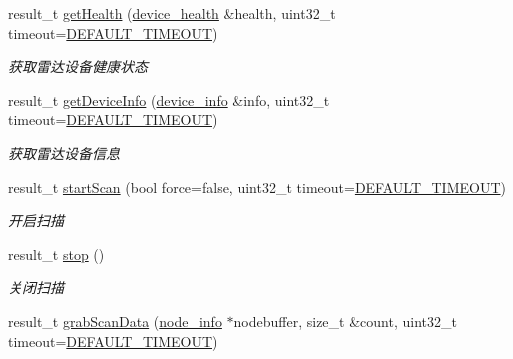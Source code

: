 \begin{DoxyCompactItemize}
\begin{DoxyCompactList}
\end{DoxyCompactList}\item 
result\+\_\+t \hyperlink{classydlidar_1_1_y_dlidar_driver_a9fe6f8b842a2aff2c3ae13f8423b03f4}{get\+Health} (\hyperlink{structdevice__health}{device\+\_\+health} \&health, uint32\+\_\+t timeout=\hyperlink{classydlidar_1_1_y_dlidar_driver_a13a4f2dc4067b43794b2c47c06d5d27aa07c79ce96f468ff4b40495ef84584442}{D\+E\+F\+A\+U\+L\+T\+\_\+\+T\+I\+M\+E\+O\+UT})
\begin{DoxyCompactList}\small\item\em 获取雷达设备健康状态 ~\newline
\end{DoxyCompactList}\item 
result\+\_\+t \hyperlink{classydlidar_1_1_y_dlidar_driver_ab75303116c4ccb144ecc215e94114e1a}{get\+Device\+Info} (\hyperlink{structdevice__info}{device\+\_\+info} \&info, uint32\+\_\+t timeout=\hyperlink{classydlidar_1_1_y_dlidar_driver_a13a4f2dc4067b43794b2c47c06d5d27aa07c79ce96f468ff4b40495ef84584442}{D\+E\+F\+A\+U\+L\+T\+\_\+\+T\+I\+M\+E\+O\+UT})
\begin{DoxyCompactList}\small\item\em 获取雷达设备信息 ~\newline
\end{DoxyCompactList}\item 
result\+\_\+t \hyperlink{classydlidar_1_1_y_dlidar_driver_a62888da8520422b7daaae89c2935460b}{start\+Scan} (bool force=false, uint32\+\_\+t timeout=\hyperlink{classydlidar_1_1_y_dlidar_driver_a13a4f2dc4067b43794b2c47c06d5d27aa07c79ce96f468ff4b40495ef84584442}{D\+E\+F\+A\+U\+L\+T\+\_\+\+T\+I\+M\+E\+O\+UT})
\begin{DoxyCompactList}\small\item\em 开启扫描 ~\newline
\end{DoxyCompactList}\item 
result\+\_\+t \hyperlink{classydlidar_1_1_y_dlidar_driver_a7aa354e88eeb6984be4d18eae6367a0b}{stop} ()
\begin{DoxyCompactList}\small\item\em 关闭扫描 ~\newline
\end{DoxyCompactList}\item 
result\+\_\+t \hyperlink{classydlidar_1_1_y_dlidar_driver_a6d6e04efa9d7e5d4aea41ee53d4ea8af}{grab\+Scan\+Data} (\hyperlink{structnode__info}{node\+\_\+info} $\ast$nodebuffer, size\+\_\+t \&count, uint32\+\_\+t timeout=\hyperlink{classydlidar_1_1_y_dlidar_driver_a13a4f2dc4067b43794b2c47c06d5d27aa07c79ce96f468ff4b40495ef84584442}{D\+E\+F\+A\+U\+L\+T\+\_\+\+T\+I\+M\+E\+O\+UT})

\end{DoxyCompactItemize}
